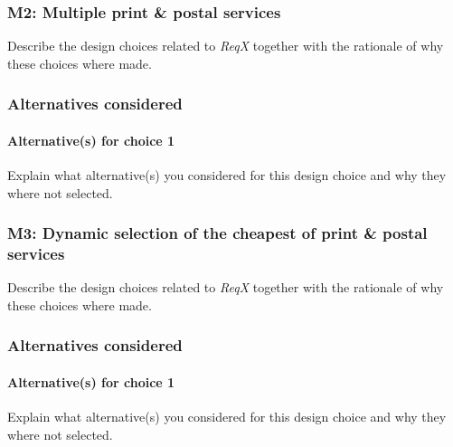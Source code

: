 \subsubsection{M2: Multiple print \& postal services}\label{march:m2}
Describe the design choices related to \emph{ReqX} together with the rationale
of why these choices where made.

\subsubsection*{Alternatives considered}
\paragraph{Alternative(s) for choice 1} Explain what alternative(s) you
considered for this design choice and why they where not selected.

\subsubsection{M3: Dynamic selection of the cheapest of print \& postal services}\label{march:m3}
Describe the design choices related to \emph{ReqX} together with the rationale
of why these choices where made.

\subsubsection*{Alternatives considered}
\paragraph{Alternative(s) for choice 1} Explain what alternative(s) you
considered for this design choice and why they where not selected.
